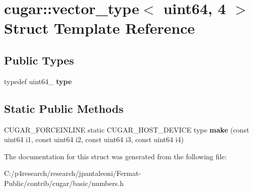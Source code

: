 \hypertarget{structcugar_1_1vector__type_3_01uint64_00_014_01_4}{}\section{cugar\+:\+:vector\+\_\+type$<$ uint64, 4 $>$ Struct Template Reference}
\label{structcugar_1_1vector__type_3_01uint64_00_014_01_4}
\subsection*{Public Types}
\begin{DoxyCompactItemize}
\item 
\mbox{\label{structcugar_1_1vector__type_3_01uint64_00_014_01_4_ab1d5819a2b5a91f47ec32f631bb5b295}} 
typedef uint64\+\_ {\bfseries type}
\end{DoxyCompactItemize}
\subsection*{Static Public Methods}
\begin{DoxyCompactItemize}
\item 
\mbox{\label{structcugar_1_1vector__type_3_01uint64_00_014_01_4_a813d7225535c12815d6f620ca69a412a}} 
C\+U\+G\+A\+R\+\_\+\+F\+O\+R\+C\+E\+I\+N\+L\+I\+NE static C\+U\+G\+A\+R\+\_\+\+H\+O\+S\+T\+\_\+\+D\+E\+V\+I\+CE type {\bfseries make} (const uint64 i1, const uint64 i2, const uint64 i3, const uint64 i4)
\end{DoxyCompactItemize}


The documentation for this struct was generated from the following file\+:\begin{DoxyCompactItemize}
\item 
C\+:/p4research/research/jpantaleoni/\+Fermat-\/\+Public/contrib/cugar/basic/numbers.\+h\end{DoxyCompactItemize}
